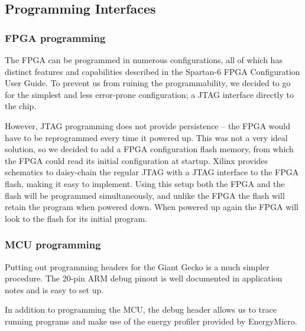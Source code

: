 
\subsection{Programming Interfaces}

\subsubsection{FPGA programming}
The FPGA can be programmed in numerous configurations, all of which has distinct
features and capabilities described in the Spartan-6 FPGA Configuration User
Guide. To prevent us from ruining the programmability, we decided to go for the
simplest and less error-prone configuration; a JTAG interface directly to the
chip.

However, JTAG programming does not provide persistence -- the FPGA would
have to be reprogrammed every time it powered up. This was not a very ideal
solution, so we decided to add a FPGA configuration flash memory, from which
the FPGA could read its initial configuration at startup. Xilinx provides
schematics to daisy-chain the regular JTAG with a
JTAG interface to the FPGA flash, making it easy to implement. Using this
setup both the FPGA and the flash will be programmed simultaneously, and 
unlike the FPGA the flash will retain the program when powered down. When
powered up again the FPGA will look to the flash for its initial program.

\subsubsection{MCU programming}
Putting out programming headers for the Giant Gecko is a much simpler procedure.
The 20-pin ARM debug pinout is well documented in application notes and is easy
to set up.

In addition to programming the MCU, the debug header allows us to trace running
programs and make use of the energy profiler provided by EnergyMicro.